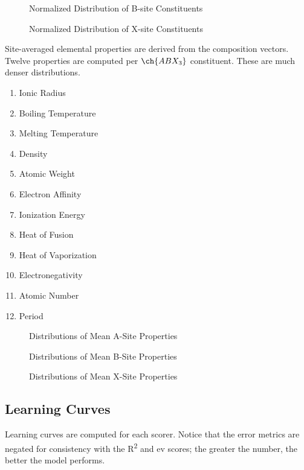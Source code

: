 \documentclass[aip, jmp, amsmath, amssymb, nofootinbib]{revtex4-2}
\begin{document}
 
\begin{figure}[htbp]
\centering

\caption{Normalized Distribution of B-site Constituents}
\end{figure}

 
\begin{figure}[htbp]
\centering

\caption{Normalized Distribution of X-site Constituents}
\end{figure}

Site-averaged elemental properties are derived from the composition
vectors. Twelve properties are computed per \(\ch{ABX_3}\)
constituent. These are much denser distributions.
\begin{enumerate}
\item Ionic Radius
\item Boiling Temperature
\item Melting Temperature
\item Density
\item Atomic Weight
\item Electron Affinity
\item Ionization Energy
\item Heat of Fusion
\item Heat of Vaporization
\item Electronegativity
\item Atomic Number
\item Period
\end{enumerate}

 
\begin{figure}[htbp]
\centering

\caption{Distributions of Mean A-Site Properties}
\end{figure}

 
\begin{figure}[htbp]
\centering

\caption{Distributions of Mean B-Site Properties}
\end{figure}

 
\begin{figure}[htbp]
\centering

\caption{Distributions of Mean X-Site Properties}
\end{figure}

\subsection*{Learning Curves}
\label{sec:org8a7016b}
Learning curves are computed for each scorer. Notice that the error
metrics are negated for consistency with the R\textsuperscript{2} and ev scores; the
greater the number, the better the model performs.
\end{document}
